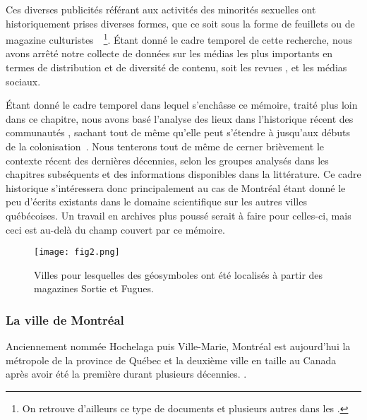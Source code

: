Ces diverses publicités référant aux activités des minorités sexuelles ont historiquement prises diverses formes, que ce soit sous la forme de feuillets ou de magazine culturistes~\citep{Higgins1999}~\footnote{On retrouve d'ailleurs ce   type de documents et plusieurs autres dans les \agq{}.}. 
Étant donné le cadre temporel de cette recherche, nous avons arrêté notre collecte de données sur les médias les plus importants en termes de distribution et de diversité de contenu, soit les revues \fugues{}, \sortie{} et les médias sociaux. 

Étant donné le cadre temporel dans lequel s’enchâsse ce mémoire, traité plus loin dans ce chapitre, nous avons basé l'analyse des lieux dans l'historique récent des communautés \lgbt{}, sachant tout de même qu'elle peut s'étendre à jusqu'aux débuts de la colonisation~\citep{Higgins1999}.
Nous tenterons tout de même de cerner brièvement le contexte récent des dernières décennies, selon les groupes analysés dans les chapitres subséquents et des informations disponibles dans la littérature. 
Ce cadre historique s'intéressera donc principalement au cas de Montréal étant donné le peu d'écrits existants dans le domaine scientifique sur les autres villes québécoises. 
Un travail en archives plus poussé serait à faire pour celles-ci, mais ceci est au-delà du champ couvert par ce mémoire.

\begin{figure}[ht]
	\begin{center}
		\texttt{[image: fig2.png]}
	\end{center}
	\caption{Villes pour lesquelles des géosymboles ont été localisés à partir des
    magazines Sortie et Fugues.}\label{fig:carte_quebec}
\end{figure}

\subsubsection{La ville de Montréal}
\label{ssub:montreal}
Anciennement nommée Hochelaga puis Ville-Marie, Montréal est aujourd'hui la métropole de la province de Québec et la deuxième ville en taille au Canada après avoir été la première durant plusieurs décennies. 
.


